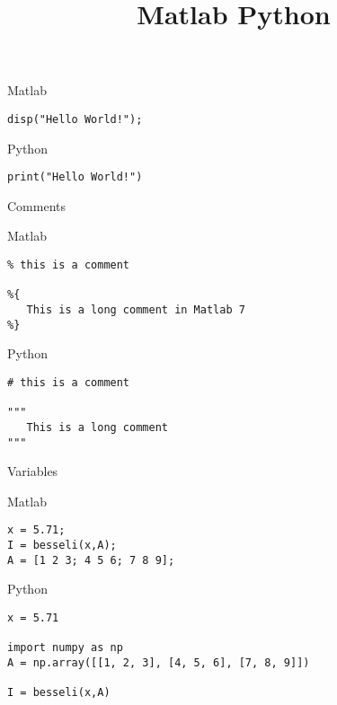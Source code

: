 \documentclass[xcolor={dvipsnames}]{beamer}
\begin{document}
\title{Matlab \Leftrightarrow Python}

\begin{frame}
	\titlepage
\end{frame}

\begin{frame}[fragile]{}

\begin{block}{Matlab}
\begin{verbatim}
disp("Hello World!");
\end{verbatim}
\end{block}

\begin{block}{Python}
\begin{verbatim}
print("Hello World!")
\end{verbatim}
\end{block}
\end{frame}

\begin{frame}[fragile]{Comments}

\begin{block}{Matlab}
\begin{verbatim}
% this is a comment

%{
   This is a long comment in Matlab 7
%}
\end{verbatim}
\end{block}

\begin{block}{Python}
\begin{verbatim}
# this is a comment

"""
   This is a long comment 
"""
\end{verbatim}
\end{block}
\end{frame}


\begin{frame}[fragile]{Variables}
\begin{block}{Matlab}
\begin{verbatim}
x = 5.71;
I = besseli(x,A);
A = [1 2 3; 4 5 6; 7 8 9];
\end{verbatim}
\end{block}

\begin{block}{Python}
\begin{verbatim}
x = 5.71

import numpy as np
A = np.array([[1, 2, 3], [4, 5, 6], [7, 8, 9]])

I = besseli(x,A)
\end{verbatim}
\end{block}
\end{frame}
\end{document}
